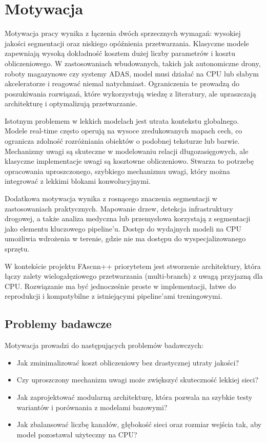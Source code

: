 \documentclass[12pt,oneside,a4paper]{report}
\begin{document}
\chapter{Motywacja}
Motywacja pracy wynika z łączenia dwóch sprzecznych wymagań: wysokiej jakości
segmentacji oraz niskiego opóźnienia przetwarzania. Klasyczne modele zapewniają
wysoką dokładność kosztem dużej liczby parametrów i kosztu obliczeniowego.
W zastosowaniach wbudowanych, takich jak autonomiczne drony, roboty magazynowe
czy systemy ADAS, model musi działać na CPU lub słabym akceleratorze i reagować
niemal natychmiast. Ograniczenia te prowadzą do poszukiwania rozwiązań, które
wykorzystują wiedzę z literatury, ale upraszczają architekturę i optymalizują
przetwarzanie.

Istotnym problemem w lekkich modelach jest utrata kontekstu globalnego. Modele
real-time często operują na wysoce zredukowanych mapach cech, co ogranicza
zdolność rozróżniania obiektów o podobnej teksturze lub barwie. Mechanizmy
uwagi są skuteczne w modelowaniu relacji długozasięgowych, ale klasyczne
implementacje uwagi są kosztowne obliczeniowo. Stwarza to potrzebę opracowania
uproszczonego, szybkiego mechanizmu uwagi, który można integrować z lekkimi
blokami konwolucyjnymi.

Dodatkowa motywacja wynika z rosnącego znaczenia segmentacji w zastosowaniach
praktycznych. Mapowanie drzew, detekcja infrastruktury drogowej, a także analiza
medyczna lub przemysłowa korzystają z segmentacji jako elementu kluczowego
pipeline'u. Dostęp do wydajnych modeli na CPU umożliwia wdrożenia w terenie,
gdzie nie ma dostępu do wyspecjalizowanego sprzętu.

W kontekście projektu FAscnn++ priorytetem jest stworzenie architektury, która łączy
zalety wielogałęziowego przetwarzania (multi-branch) z uwagą przyjazną dla CPU.
Rozwiązanie ma być jednocześnie proste w implementacji, łatwe do reprodukcji
i kompatybilne z istniejącymi pipeline'ami treningowymi.

\section{Problemy badawcze}
Motywacja prowadzi do następujących problemów badawczych:
\begin{itemize}
  \item Jak zminimalizować koszt obliczeniowy bez drastycznej utraty jakości?
  \item Czy uproszczony mechanizm uwagi może zwiększyć skuteczność lekkiej sieci?
  \item Jak zaprojektować modularną architekturę, która pozwala na szybkie testy
        wariantów i porównania z modelami bazowymi?
  \item Jak zbalansować liczbę kanałów, głębokość sieci oraz rozmiar wejścia tak,
        aby model pozostawał użyteczny na CPU?
\end{itemize}
\end{document}
